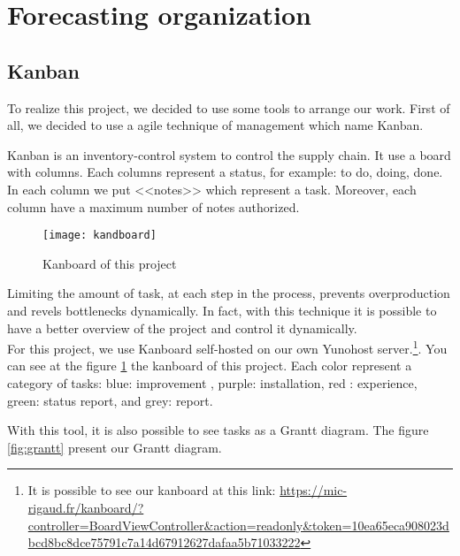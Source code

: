 \section{Forecasting organization}

\subsection{Kanban}

To realize this project, we decided to use some tools to arrange our work. First of all, we decided to use a agile
technique of management which name Kanban.~\\



Kanban is an inventory-control system to control the supply chain. It use a board with columns. Each columns
represent a status, for example: to do, doing, done. In each column we put <<notes>> which represent a task.
Moreover, each column have a maximum number of notes authorized.


\begin{figure}[h]
  \centering
  \texttt{[image: kandboard]}
  \caption{Kanboard of this project}
  \label{fig:kanboard}
\end{figure}


Limiting the amount of task, at each step in the process, prevents overproduction and revels bottlenecks
dynamically. In fact, with this technique it is possible to have a better overview of the project and control it
dynamically.
~\\

For this project, we use Kanboard\cite{guillot:kanboard} self-hosted on our own Yunohost server.\footnote{ It is possible to
  see our kanboard at this link:
  \url{https://mic-rigaud.fr/kanboard/?controller=BoardViewController&action=readonly&token=10ea65eca908023dbcd8bc8dce75791c7a14d67912627dafaa5b71033222}}.
You can see at the figure \ref{fig:kanboard} the kanboard of this project. Each color represent a category of tasks:
blue: improvement , purple: installation, red : experience, green: status report, and grey: report.

With this tool, it is also possible to see tasks as a Grantt diagram. The figure \ref{fig:grantt} present our
Grantt diagram.

